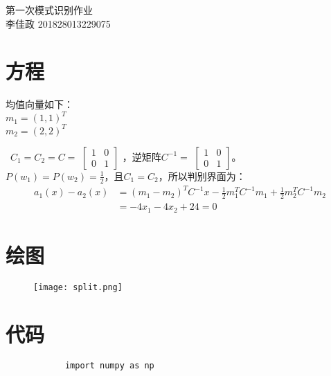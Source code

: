 \documentclass{article}
\begin{document}
\begin{CJK*}{UTF8}{gbsn}

        \begin{center}
            \textsc{\LARGE 第一次模式识别作业}\\[1.5cm]
            \textsc{\LARGE 李佳政 201828013229075}\\[1.cm]
        \end{center}
        
        \section{方程}
        均值向量如下：\\
        $m_{1} = {(1, 1)^{T}}$\\
        $m_{2} = {(2, 2)}^{T}$
        
        \
        $C_{1}=C_{2}=C=$
        $\begin{bmatrix}
            1 & 0 \\
            0 & 1
        \end{bmatrix}$
        ，逆矩阵$C^{-1}=$
        $\begin{bmatrix}
            1 & 0 \\
            0 & 1
        \end{bmatrix}$。\\
        
        $P({w_{1}})=P({w_{2}})=\frac{1}{2}$，且$C_{1}=C_{2}$，所以判别界面为：
        \begin{align*}
            a_{1}(x)-a_{2}(x) &={(m_{1}-m_{2})}^{T}C^{-1}x-\frac{1}{2}m_{1}^{T}C^{-1}m_{1}+\frac{1}{2}m_{2}^{T}C^{-1}m_{2} \\ 
             &= -4x_{1}-4x_{2}+24 = 0
        \end{align*}

        \section{绘图}
        \begin{figure}[h]
            \centering
            \texttt{[image: split.png]}
        \end{figure}
        
        \section{代码}
        \lstset{language=python}
        \begin{lstlisting}
            import numpy as np


\end{lstlisting}
\end{CJK*}
\end{document}
